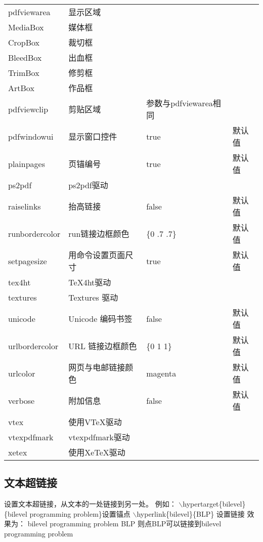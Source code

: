 \begin{center}
\begin{longtable}[H]{p{3.2cm}p{3cm}p{3cm}p{3cm}}
pdfviewarea &显示区域 &&\\
MediaBox & 媒体框 &&\\
CropBox &裁切框 &&\\
BleedBox &出血框 &&\\
TrimBox &修剪框 &&\\
ArtBox &作品框 &&\\

pdfviewclip &剪贴区域&参数与pdfviewarea相同&\\
pdfwindowui &显示窗口控件 &true& 默认值\\
plainpages &页锚编号&true &默认值\\

ps2pdf &ps2pdf驱动&&\\
raiselinks &抬高链接&false &默认值\\
runbordercolor &run链接边框颜色&\{0 .7 .7\} &默认值\\
setpagesize &用命令设置页面尺寸&true &默认值\\

tex4ht& TeX4ht驱动&&\\
textures &Textures 驱动&&\\
unicode &Unicode 编码书签&false& 默认值\\
urlbordercolor &URL 链接边框颜色&\{0 1 1\} &默认值\\
urlcolor &网页与电邮链接颜色&magenta &默认值\\
verbose &附加信息&false &默认值\\
vtex &使用VTeX驱动&&\\
vtexpdfmark &vtexpdfmark驱动&&\\
xetex &使用XeTeX驱动&&\\
\end{longtable}
\end{center}
\subsection{文本超链接}

设置文本超链接，从文本的一处链接到另一处。 \newline 例如： \newline
$\backslash $hypertarget{\{}bilevel{\}}{\{}bilevel programming
problem{\}}设置锚点 \newline $\backslash
$hyperlink{\{}bilevel{\}}{\{}BLP{\}} 设置链接 \newline
\newline
\textcolor[rgb]{0.50,0.00,0.50}{效果为：} \newline bilevel
programming problem \newline BLP \newline 则点BLP可以链接到bilevel
programming problem \newline


